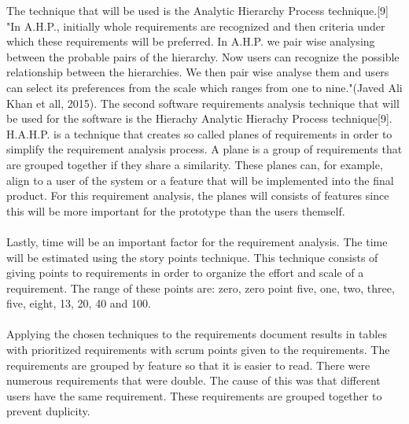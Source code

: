 \documentclass[paper=a4, fontsize=11pt,twoside]{scrartcl}	%
\begin{document}
The technique that will be used is the Analytic Hierarchy Process technique.[9] "In A.H.P., initially whole requirements are recognized and then criteria under which these requirements will be preferred. In A.H.P. we pair wise analysing  between  the  probable  pairs  of  the  hierarchy. 
Now users can recognize the possible relationship between 
the hierarchies. We then pair wise analyse them and users can select its preferences from the scale which ranges from 
one to nine."(Javed Ali Khan et all, 2015). The second software requirements analysis technique that will be used for the software is the Hierachy Analytic Hierachy Process technique[9]. H.A.H.P. is a technique that creates so called planes of requirements in order to simplify the requirement analysis process. A plane is a group of requirements that are grouped together if they share a similarity. These planes can, for example, align to a user of the system or a feature that will be implemented into the final product. For this requirement analysis, the planes will consists of features since this will be more important for the prototype than the users themself. \\ \\
Lastly, time will be an important factor for the requirement analysis. The time will be estimated using the story points technique. This technique consists of giving  points to requirements in order to organize the effort and scale of a requirement. The range of these points are:  zero, zero point five, one, two, three, five, eight, 13, 20, 40 and 100. \\ \\
Applying the chosen techniques to the requirements document results in tables with prioritized requirements with scrum points given to the requirements. The requirements are grouped by feature so that it is easier to read. There were numerous requirements that were double. The cause of this was that different users have the same requirement. These requirements are grouped together to prevent duplicity. \\

\newpage
\end{document}
